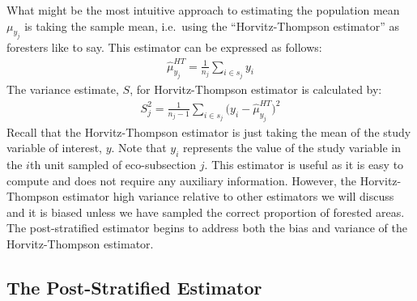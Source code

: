 \documentclass[12pt,twoside]{reedthesis}
\begin{document}
What might be the most intuitive approach to estimating the population mean \(\mu_{y_j}\) is taking the sample mean, i.e.~using the ``Horvitz-Thompson estimator'' as foresters like to say. This estimator can be expressed as follows:
\begin{align}
\hat\mu_{y_j}^{HT} = \frac{1}{n_j} \sum_{i \in s_j} y_i
\end{align}
The variance estimate, \(S\), for Horvitz-Thompson estimator is calculated by:
\begin{align}
S_j^{2} = \frac{1}{n_j-1} \sum_{i \in s_j} \Big(y_i - \hat\mu_{y_j}^{HT}\Big)^2
\end{align}
Recall that the Horvitz-Thompson estimator is just taking the mean of the study variable of interest, \(y\). Note that \(y_i\) represents the value of the study variable in the \(i\)th unit sampled of eco-subsection \(j\). This estimator is useful as it is easy to compute and does not require any auxiliary information. However, the Horvitz-Thompson estimator high variance relative to other estimators we will discuss and it is biased unless we have sampled the correct proportion of forested areas. The post-stratified estimator begins to address both the bias and variance of the Horvitz-Thompson estimator.

\hypertarget{the-post-stratified-estimator}{%
\subsection{The Post-Stratified Estimator}\label{the-post-stratified-estimator}}
\end{document}
